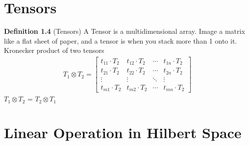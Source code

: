 \documentclass{report}
\begin{document}
\section{Tensors}
\textbf{Definition 1.4} (Tensors) A Tensor is a multidimensional array. Image a matrix like a flat sheet of paper, and a tensor is when you stack more than 1 onto it.\\

\noindent Kronecker product of two tensors
\begin{align}
    T_1 \otimes T_2 = \begin{bmatrix}
    t_{11} \cdot T_2 & t_{12} \cdot T_2 & \cdots & t_{1n} \cdot T_2 \\
    t_{21} \cdot T_2 & t_{22} \cdot T_2 & \cdots & t_{2n} \cdot T_2 \\
    \vdots & \vdots & \ddots & \vdots \\
    t_{m1} \cdot T_2 & t_{m2} \cdot T_2 & \cdots & t_{mn} \cdot T_2
\end{bmatrix}
\end{align}
$T_1 \otimes T_2$ = $T_2 \otimes T_1$
\section{Linear Operation in Hilbert Space}
\end{document}
